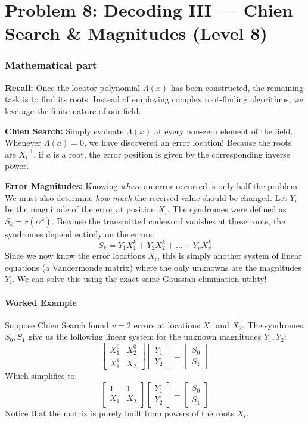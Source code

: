 \section*{Problem 8: Decoding III --- Chien Search \& Magnitudes (Level 8)}

\subsubsection*{Mathematical part}
\textbf{Recall:} Once the locator polynomial $\Lambda(x)$ has been constructed, the remaining task is to find its roots. Instead of employing complex root-finding algorithms, we leverage the finite nature of our field.

\textbf{Chien Search:} Simply evaluate $\Lambda(x)$ at every non-zero element of the field. Whenever $\Lambda(a) = 0$, we have discovered an error location! Because the roots are $X_i^{-1}$, if $a$ is a root, the error position is given by the corresponding inverse power.

\textbf{Error Magnitudes:} Knowing \emph{where} an error occurred is only half the problem. We must also determine \emph{how much} the received value should be changed. Let $Y_i$ be the magnitude of the error at position $X_i$. The syndromes were defined as $S_k = r(\alpha^k)$. Because the transmitted codeword vanishes at these roots, the syndromes depend entirely on the errors:
\[
S_k = Y_1 X_1^k + Y_2 X_2^k + \dots + Y_v X_v^k
\]
Since we now know the error locations $X_i$, this is simply another system of linear equations (a Vandermonde matrix) where the only unknowns are the magnitudes $Y_i$. We can solve this using the exact same Gaussian elimination utility!

\paragraph{Worked Example}
Suppose Chien Search found $v=2$ errors at locations $X_1$ and $X_2$. The syndromes $S_0, S_1$ give us the following linear system for the unknown magnitudes $Y_1, Y_2$:
\[
\begin{bmatrix}
X_1^0 & X_2^0 \\
X_1^1 & X_2^1
\end{bmatrix}
\begin{bmatrix}
Y_1 \\
Y_2
\end{bmatrix}
=
\begin{bmatrix}
S_0 \\
S_1
\end{bmatrix}
\]
Which simplifies to:
\[
\begin{bmatrix}
1 & 1 \\
X_1 & X_2
\end{bmatrix}
\begin{bmatrix}
Y_1 \\
Y_2
\end{bmatrix}
=
\begin{bmatrix}
S_0 \\
S_1
\end{bmatrix}
\]
Notice that the matrix is purely built from powers of the roots $X_i$.

